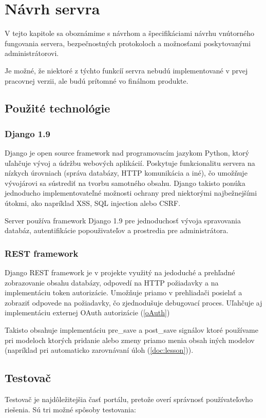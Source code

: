 \chapter{Návrh servra}

\label{kap:server}

V tejto kapitole sa oboznámime s návrhom a špecifikáciami návrhu vnútorného fungovania servera,
bezpečnostných protokoloch a možnosťami poskytovanými administrátorovi.

Je možné, že niektoré z týchto funkcíí servra nebudú implementované v prvej pracovnej verzii,
ale budú prítomné vo finálnom produkte.

\section{Použité technológie}

\subsection{Django 1.9}
Django je open source framework nad programovacím jazykom Python, ktorý uľahčuje vývoj a údržbu webových aplikácií.
Poskytuje funkcionalitu servera na nízkych úrovniach (správa databázy, HTTP komunikácia a iné), čo umožňuje vývojárovi sa sústrediť na tvorbu samotného obsahu.
Django takisto ponúka jednoducho implementovateľné možnosti ochrany pred niektorými najbežnejšími útokmi, ako napríklad XSS, SQL injection alebo CSRF.

Server používa framework Django 1.9 pre jednoduchosť vývoja spravovania databáz, autentifikácie popouživateľov a prostredia pre administrátora.
\subsection{REST framework}
Django REST framework je v projekte využitý na jedoduché a prehľadné zobrazovanie obsahu databázy, odpovedí na HTTP požiadavky a na implementáciu
token autorizácie. Umožňuje priamo v prehliadači posielať a zobraziť odpovede na požiadavky, čo zjednodušuje debugovací proces. Uľahčuje aj implementáciu externej OAuth
autorizácie (\ref{oAuth})

Takisto obsahuje implementáciu pre\_save a post\_save signálov ktoré používame pri
modeloch ktorých pridanie alebo zmeny priamo menia obsah iných modelov
(napríklad pri automaticko zarovnávaní úloh (\ref{doc:lesson})).
\section{Testovač}
\label{testovace}
Testovač je najdôležitejšia časť portálu, pretože overí správnosť používateľovho riešenia. Sú tri možné spôsoby testovania:
